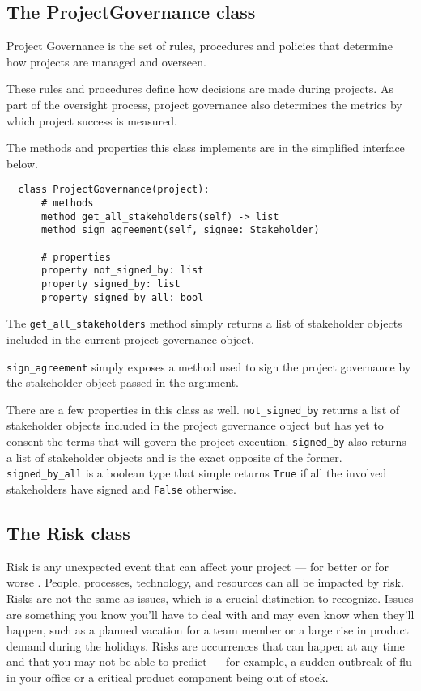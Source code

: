\subsection{The ProjectGovernance class}
Project Governance is the set of rules, procedures and policies that determine how projects are managed and overseen.

These rules and procedures define how decisions are made during projects. As part of the oversight process, project governance also determines the metrics by which project success is measured.

The methods and properties this class implements are in the simplified interface below.

\begin{lstlisting}
  class ProjectGovernance(project):
      # methods
      method get_all_stakeholders(self) -> list
      method sign_agreement(self, signee: Stakeholder)

      # properties
      property not_signed_by: list
      property signed_by: list
      property signed_by_all: bool
\end{lstlisting}

The \verb+get_all_stakeholders+ method simply returns a list of stakeholder objects included in the current project governance object.

\verb+sign_agreement+ simply exposes a method used to sign the project governance by the stakeholder object passed in the argument.

There are a few properties in this class as well. \verb+not_signed_by+ returns a list of stakeholder objects included in the project governance object but has yet to consent the terms that will govern the project execution. \verb+signed_by+ also returns a list of stakeholder objects and is the exact opposite of the former.
\verb+signed_by_all+ is a boolean type that simple returns \verb+True+ if all the involved stakeholders have signed and \verb+False+ otherwise.


\subsection{The Risk class}
Risk is any unexpected event that can affect your project — for better or for worse \cite{wrike-2}. People, processes, technology, and resources can all be impacted by risk. Risks are not the same as issues, which is a crucial distinction to recognize. Issues are something you know you'll have to deal with and may even know when they'll happen, such as a planned vacation for a team member or a large rise in product demand during the holidays. Risks are occurrences that can happen at any time and that you may not be able to predict — for example, a sudden outbreak of flu in your office or a critical product component being out of stock.

